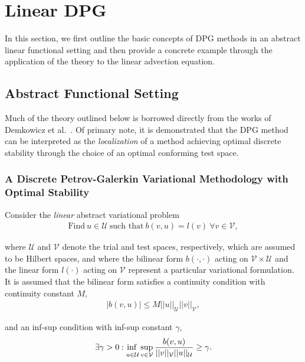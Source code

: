 \section{Linear DPG} \label{sec:dpg_linear}

In this section, we first outline the basic concepts of DPG methods in an abstract linear functional setting and then
provide a concrete example through the application of the theory to the linear advection equation.

\subsection{Abstract Functional Setting}

Much of the theory outlined below is borrowed directly from the works of Demkowicz et
al.~\cite{Demkowicz2014_overview,Demkowicz2017}. Of primary note, it is demonstrated that the DPG method can be
interpreted as the \emph{localization} of a method achieving optimal discrete stability through the choice of an
optimal conforming test space.

\subsubsection{A Discrete Petrov-Galerkin Variational Methodology with Optimal Stability}

Consider the \emph{linear} abstract variational problem
\begin{align} \label{eq:bilinear_abstract_infinite}
\text{Find}\ u \in \mathcal{U}\ \text{such that}\
b(v,u) = l(v)\ \forall v \in \mathcal{V},
\end{align}

where $\mathcal{U}$ and $\mathcal{V}$ denote the trial and test spaces, respectively, which are assumed to be Hilbert
spaces, and where the bilinear form $b(\cdot,\cdot)$ acting on $\mathcal{V} \times \mathcal{U}$ and the linear form
$l(\cdot)$ acting on $\mathcal{V}$ represent a particular variational formulation. It is assumed that the bilinear form
satisfies a continuity condition with continuity constant $M$,
\begin{align}
| b(v,u) | \le M ||u||_{\mathcal{U}} ||v||_{\mathcal{V}},
\end{align}

and an inf-sup condition with inf-sup constant $\gamma$,
\begin{align} \label{eq:inf_sup_infinite}
\exists \gamma > 0 :
\adjustlimits\inf_{u\in\mathcal{U}} \sup_{v\in\mathcal{V}}
\frac{b(v,u)}{||v||_{\mathcal{V}}||u||_{\mathcal{U}}} \ge \gamma.
\end{align}

